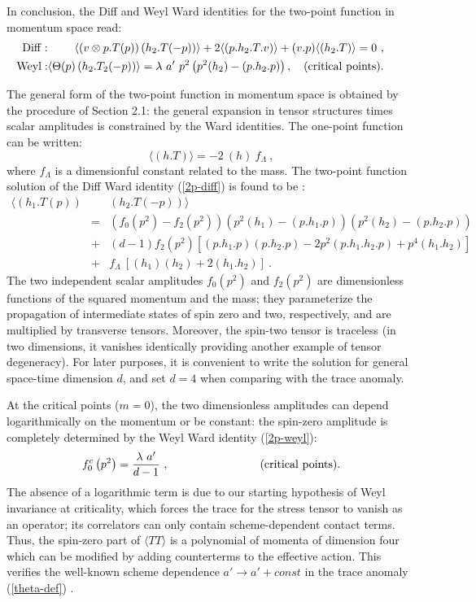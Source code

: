 \documentclass[11pt]{article}
\newcommand{\beq}{\begin{equation}}
\newcommand{\eeq}{\end{equation}}
\newcommand{\bea}{\begin{eqnarray}}
\newcommand{\eea}{\end{eqnarray}}
\def\l{\lambda}
\def\T{\Theta}
\def\nl{\nonumber\\}
\def\bh{\!\!\!\!\!\!}
\def\bra{\langle}
\def\ket{\rangle}
\begin{document}
In conclusion, the Diff and Weyl
Ward identities for the two-point function in momentum space read:
\bea 
\bh\bh {\rm Diff}:
&&\bh \bra \left(v\otimes p.T(p)\right) \left(h_2.T(-p)\right)\ket +
2 \bra \left( p.h_2.T.v \right) \ket + 
(v.p) \bra \left( h_2.T \right) \ket =0\ ,
\label{2p-diff}\\ 
\bh\bh {\rm Weyl}:
&&\bh \bra \T(p) \left(h_2.T_2(-p)\right) \ket =\l \  a' 
\ p^2 \left( p^2 (h_2)- (p.h_2.p) \right), 
\quad  ({\rm critical}\ {\rm points}).
\label{2p-weyl} 
\eea 
 
The general form of the two-point function in momentum space is obtained
by the procedure of Section 2.1:
the general expansion in tensor structures times scalar 
amplitudes is constrained by the Ward identities.
The one-point function can be written:
\beq
\bra \left( h.T \right)\ket = - 2\ (h)\ f_\Lambda \ ,
\label{1p-t}\eeq
where $f_\Lambda$ is a dimensionful constant related to the mass.
The two-point function solution of the Diff Ward identity
(\ref{2p-diff}) is found to be \cite{cfl}: 
\bea\label{2p-tt} 
\bra \left(h_1.T(p)\right) \bh && \bh \left(h_2.T(-p)\right)\ket \nl 
&=& \left( f_0\left(p^2 \right)-f_2\left(p^2 \right) \right) 
    \left(p^2 (h_1) - (p.h_1.p) \right) 
    \left(p^2 (h_2) - (p.h_2.p) \right) \nl 
&+& (d-1)f_2\left(p^2 \right)\left[(p.h_1.p)(p.h_2.p) -2p^2 (p.h_1.h_2.p) 
               + p^4 (h_1.h_2) \right] \nl 
&+& f_\Lambda\ \left[ (h_1)(h_2) +2 (h_1.h_2) \right] \ . 
\eea 
The two independent scalar amplitudes 
$f_0\left(p^2 \right)$ and $f_2\left(p^2 \right)$
are dimensionless functions of the squared momentum and the mass;
they parameterize the propagation of  
intermediate states of spin zero and two, respectively, and
are multiplied by transverse tensors. 
Moreover, the spin-two tensor is traceless (in two dimensions, 
it vanishes identically providing another example of tensor degeneracy). 
For later purposes, it is convenient to write the  
solution for general space-time dimension $d$, and set $d=4$ when comparing 
with the trace anomaly. 
  
At the critical points ($m=0$), 
the two dimensionless amplitudes can depend
logarithmically on the momentum or be constant:
the spin-zero amplitude is completely determined by 
the Weyl Ward identity (\ref{2p-weyl}):
\beq\label{f0} 
f^c_0\left(p^2 \right) = {\l \ a'\over d-1}\ , \qquad\qquad 
 \qquad\qquad ({\rm critical}\ {\rm points}). 
\eeq 
The absence of a logarithmic term is due to our
starting hypothesis of Weyl invariance at criticality, which forces the  
trace for the stress tensor to vanish as an operator; its correlators
can only contain scheme-dependent contact terms.
Thus, the spin-zero part of $\bra TT\ket$ is a polynomial of
momenta of dimension four which can be modified
by adding counterterms to the effective action.
This verifies the well-known
scheme dependence $a' \to a' + const$ in the trace anomaly (\ref{theta-def})
\cite{duff}.
\end{document}
